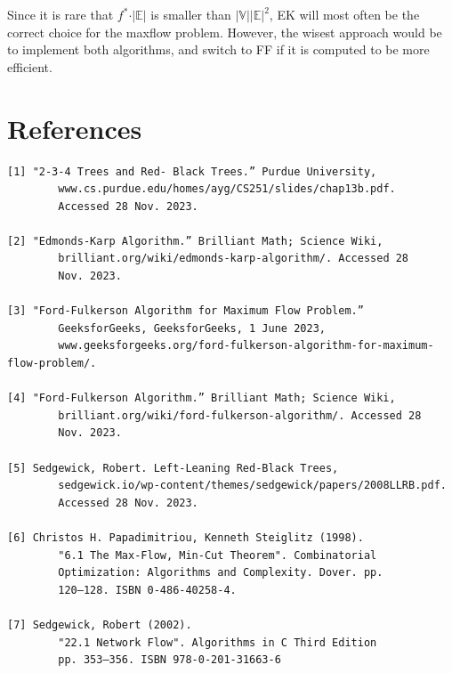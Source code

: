 \documentclass[12pt]{amsart}
\begin{document}
    Since it is rare that $f^* \cdot \vert \mathbb{E} \vert$ is
    smaller than
    $\vert \mathbb{V} \vert \vert \mathbb{E} \vert ^2$, EK will
    most often be the correct choice for the maxflow problem.
    However, the wisest approach would be to implement both
    algorithms, and switch to FF if it is computed to be more
    efficient.

\newpage
\section{References}

\begin{verbatim}
[1] "2-3-4 Trees and Red- Black Trees.” Purdue University,
        www.cs.purdue.edu/homes/ayg/CS251/slides/chap13b.pdf.
        Accessed 28 Nov. 2023. 

[2] "Edmonds-Karp Algorithm.” Brilliant Math; Science Wiki,
        brilliant.org/wiki/edmonds-karp-algorithm/. Accessed 28
        Nov. 2023. 

[3] "Ford-Fulkerson Algorithm for Maximum Flow Problem.”
        GeeksforGeeks, GeeksforGeeks, 1 June 2023,
        www.geeksforgeeks.org/ford-fulkerson-algorithm-for-maximum-flow-problem/. 

[4] "Ford-Fulkerson Algorithm.” Brilliant Math; Science Wiki,
        brilliant.org/wiki/ford-fulkerson-algorithm/. Accessed 28
        Nov. 2023. 

[5] Sedgewick, Robert. Left-Leaning Red-Black Trees,
        sedgewick.io/wp-content/themes/sedgewick/papers/2008LLRB.pdf.
        Accessed 28 Nov. 2023. 

[6] Christos H. Papadimitriou, Kenneth Steiglitz (1998).
        "6.1 The Max-Flow, Min-Cut Theorem". Combinatorial
        Optimization: Algorithms and Complexity. Dover. pp.
        120–128. ISBN 0-486-40258-4.

[7] Sedgewick, Robert (2002).
        "22.1 Network Flow". Algorithms in C Third Edition
        pp. 353–356. ISBN 978-0-201-31663-6 

\end{verbatim}
\end{document}

